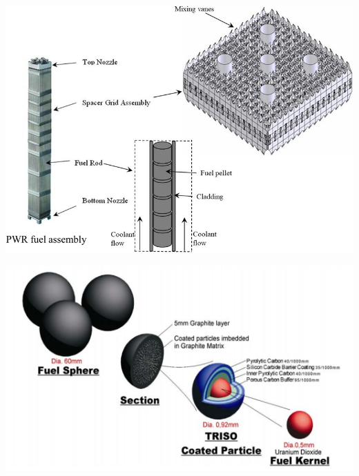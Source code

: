 \documentclass[12pt]{article}
\begin{document}
    \begin{center}
    \includegraphics[keepaspectratio, width=\textwidth]{pwr-assembly.png}
    \end{center}

    \begin{center}
    \includegraphics[keepaspectratio, width=\textwidth]{triso.png}
    \end{center}
\end{document}
